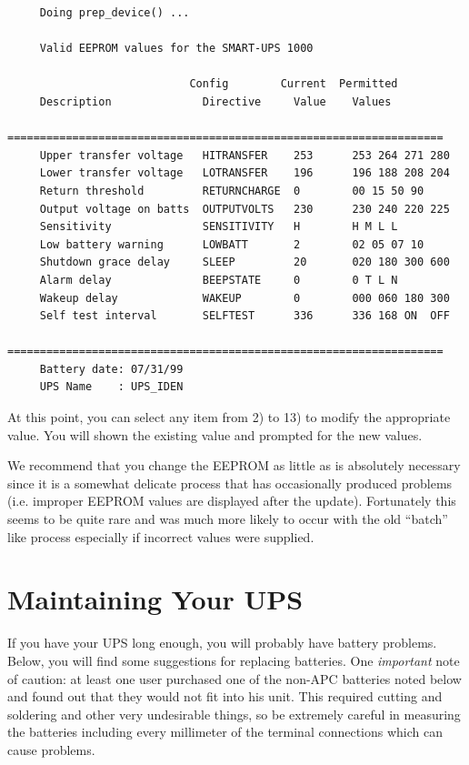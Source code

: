 {{{{{{\begin{verbatim}
     Doing prep_device() ...
     
     Valid EEPROM values for the SMART-UPS 1000
     
                            Config        Current  Permitted
     Description              Directive     Value    Values
     ===================================================================
     Upper transfer voltage   HITRANSFER    253      253 264 271 280
     Lower transfer voltage   LOTRANSFER    196      196 188 208 204
     Return threshold         RETURNCHARGE  0        00 15 50 90
     Output voltage on batts  OUTPUTVOLTS   230      230 240 220 225
     Sensitivity              SENSITIVITY   H        H M L L
     Low battery warning      LOWBATT       2        02 05 07 10
     Shutdown grace delay     SLEEP         20       020 180 300 600
     Alarm delay              BEEPSTATE     0        0 T L N
     Wakeup delay             WAKEUP        0        000 060 180 300
     Self test interval       SELFTEST      336      336 168 ON  OFF
     ===================================================================
     Battery date: 07/31/99
     UPS Name    : UPS_IDEN
\end{verbatim}
\normalsize

At this point, you can select any item from 2) to 13) to modify the
appropriate value. You will shown the existing value and prompted for the new
values.  

We recommend that you change the EEPROM as little as is absolutely necessary
since it is a somewhat delicate process that has occasionally produced
problems (i.e. improper EEPROM values are displayed after the update).
Fortunately this seems to be quite rare and was much more likely to occur with
the old ``batch'' like process especially if incorrect values were supplied. 

\label{Maintaining-Your-UPS}

\section*{Maintaining Your UPS}

\label{index-Maintenance-144}
If you have your UPS long enough, you will probably have battery problems.
Below, you will find some suggestions for replacing batteries. One {\it
important} note of caution: at least one user purchased one of the non-APC
batteries noted below and found out that they would not fit into his unit.
This required cutting and soldering and other very undesirable things, so be
extremely careful in measuring the batteries including every millimeter of the
terminal connections which can cause problems.  

}}}}}}
